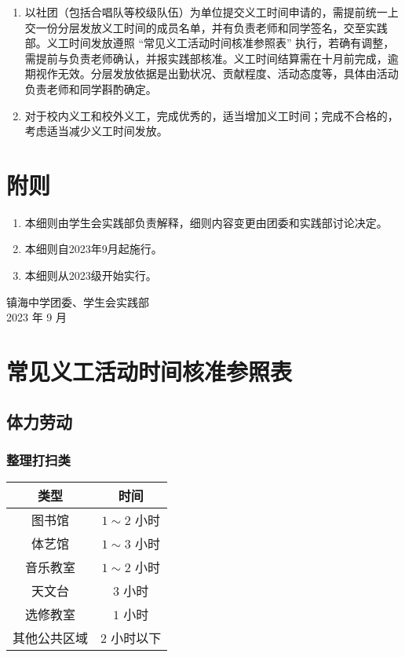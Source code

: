 \documentclass{article}
\begin{document}
\begin{enumerate}[resume, label=\heiti{\textbf{第\chinese*条}}, leftmargin=4em]
  \item 以社团（包括合唱队等校级队伍）为单位提交义工时间申请的，需提前统一上交一份分层发放义工时间的成员名单，并有负责老师和同学签名，交至实践部。义工时间发放遵照 ``常见义工活动时间核准参照表'' 执行，若确有调整，需提前与负责老师确认，并报实践部核准。义工时间结算需在十月前完成，逾期视作无效。分层发放依据是出勤状况、贡献程度、活动态度等，具体由活动负责老师和同学斟酌确定。
  \item 对于校内义工和校外义工，完成优秀的，适当增加义工时间；完成不合格的，考虑适当减少义工时间发放。
\end{enumerate}

\section{附则}

\begin{enumerate}[resume, label=\heiti{\textbf{第\chinese*条}}, leftmargin=4em]
  \fangsong
  \item 本细则由学生会实践部负责解释，细则内容变更由团委和实践部讨论决定。
  \item 本细则自2023年9月起施行。
  \item 本细则从2023级开始实行。
\end{enumerate}

\begin{center}
  \flushright
  \songti
  镇海中学团委、学生会实践部\\
  2023 年 9 月
\end{center}

\appendix

\section{常见义工活动时间核准参照表}

\renewcommand\thesubsection{\chinese{subsection}}

\subsection{体力劳动}

\subsubsection*{整理打扫类}

\begin{tabular}{cc}
  \hline
  \textbf{类型} & \textbf{时间} \\
  \hline
  图书馆 & $1 \sim 2$ 小时 \\
  体艺馆 & $1 \sim 3$ 小时 \\
  音乐教室 & $1 \sim 2$ 小时 \\
  天文台 & $3$ 小时 \\
  选修教室 & $1$ 小时 \\
  其他公共区域 & $2$ 小时以下 \\
  \hline
\end{tabular}
\end{document}
